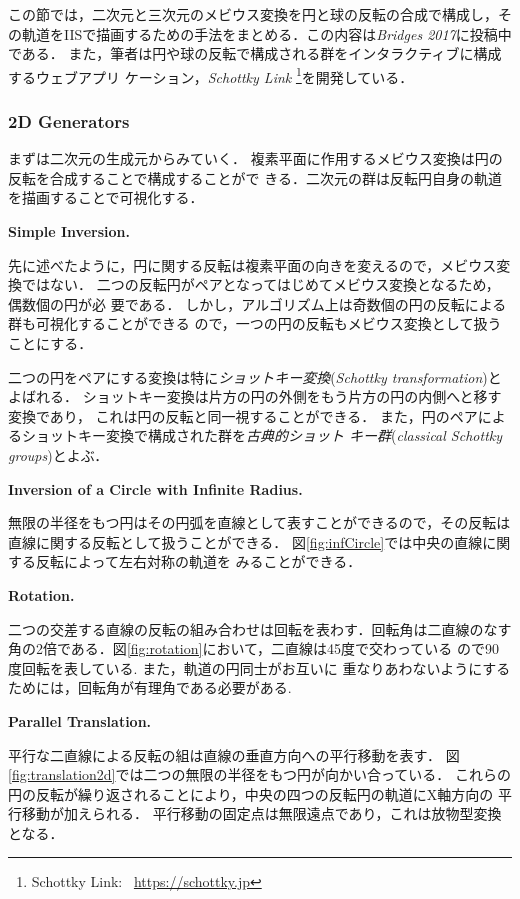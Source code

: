 この節では，二次元と三次元のメビウス変換を円と球の反転の合成で構成し，そ
の軌道をIISで描画するための手法をまとめる．この内容は\textit{Bridges
2017}に投稿中である．
また，筆者は円や球の反転で構成される群をインタラクティブに構成するウェブアプリ
ケーション，{\it Schottky Link} \footnote{Schottky Link:~
\url{https://schottky.jp}}を開発している．

\subsubsection{2D Generators}

まずは二次元の生成元からみていく．
複素平面に作用するメビウス変換は円の反転を合成することで構成することがで
きる．二次元の群は反転円自身の軌道を描画することで可視化する．

\noindent\textbf{Simple Inversion.}

先に述べたように，円に関する反転は複素平面の向きを変えるので，メビウス変
換ではない．
二つの反転円がペアとなってはじめてメビウス変換となるため，偶数個の円が必
要である．
しかし，アルゴリズム上は奇数個の円の反転による群も可視化することができる
ので，一つの円の反転もメビウス変換として扱うことにする．

二つの円をペアにする変換は特に\emph{ショットキー変換}(\textit{Schottky
transformation})とよばれる．
ショットキー変換は片方の円の外側をもう片方の円の内側へと移す変換であり，
これは円の反転と同一視することができる．
また，円のペアによるショットキー変換で構成された群を\emph{古典的ショット
キー群}(\textit{classical Schottky groups})とよぶ．

\noindent\textbf{Inversion of a Circle with Infinite Radius.}

無限の半径をもつ円はその円弧を直線として表すことができるので，その反転は
直線に関する反転として扱うことができる．
図\ref{fig:infCircle}では中央の直線に関する反転によって左右対称の軌道を
みることができる．

\noindent\textbf{Rotation.}

二つの交差する直線の反転の組み合わせは回転を表わす．回転角は二直線のなす
角の2倍である．図\ref{fig:rotation}において，二直線は45度で交わっている
ので90度回転を表している. また，軌道の円同士がお互いに
重なりあわないようにするためには，回転角が有理角である必要がある.

\noindent\textbf{Parallel Translation.}

平行な二直線による反転の組は直線の垂直方向への平行移動を表す．
図\ref{fig:translation2d}では二つの無限の半径をもつ円が向かい合っている．
これらの円の反転が繰り返されることにより，中央の四つの反転円の軌道にX軸方向の
平行移動が加えられる．
平行移動の固定点は無限遠点であり，これは放物型変換となる．

